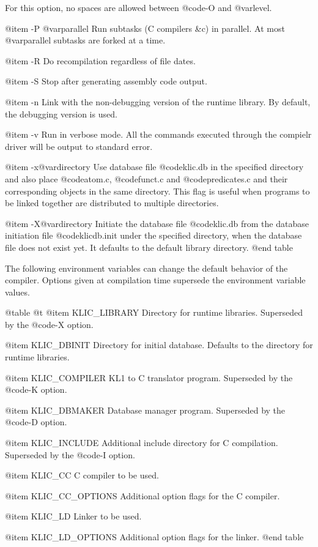 {{{{For this option, no spaces are allowed between @code{-O} and
@var{level}.

@item -P @var{parallel}
Run subtasks (C compilers &c) in parallel.  At most @var{parallel}
subtasks are forked at a time.

@item -R
Do recompilation regardless of file dates.

@item -S
Stop after generating assembly code output.

@item -n
Link with the non-debugging version of the runtime library.  By default,
the debugging version is used.

@item -v
Run in verbose mode.  All the commands executed through the compielr
driver will be output to standard error.

@item -x@var{directory}
Use database file @code{klic.db} in the specified directory and also
place @code{atom.c}, @code{funct.c} and @code{predicates.c} and their
corresponding objects in the same directory.  This flag is useful when
programs to be linked together are distributed to multiple
directories.

@item -X@var{directory}
Initiate the database file @code{klic.db} from the database initiation
file @code{klicdb.init} under the specified directory, when the database
file does not exist yet.  It defaults to the default library directory.
@end table

The following environment variables can change the default behavior of
the compiler.  Options given at compilation time supersede the
environment variable values.

@table @t
@item KLIC_LIBRARY
Directory for runtime libraries.  Superseded by the @code{-X} option.

@item KLIC_DBINIT
Directory for initial database.  Defaults to the directory for runtime
libraries.

@item KLIC_COMPILER
KL1 to C translator program.  Superseded by the @code{-K} option.

@item KLIC_DBMAKER
Database manager program.  Superseded by the @code{-D} option.

@item KLIC_INCLUDE
Additional include directory for C compilation.  Superseded by the
@code{-I} option.

@item KLIC_CC
C compiler to be used.

@item KLIC_CC_OPTIONS
Additional option flags for the C compiler.

@item KLIC_LD
Linker to be used.

@item KLIC_LD_OPTIONS
Additional option flags for the linker.
@end table

}}}}

